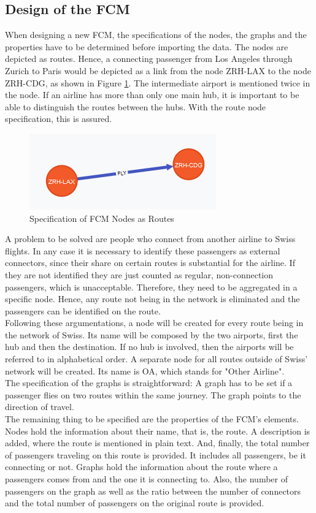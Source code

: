 \documentclass[conference]{IEEEtran}
\begin{document}
\subsection{Design of the FCM}
When designing a new FCM, the specifications of the nodes, the graphs and the properties have to be determined before importing the data. The nodes are depicted as routes. Hence, a connecting passenger from Los Angeles through Zurich to Paris would be depicted as a link from the node ZRH-LAX to the node ZRH-CDG, as shown in Figure \ref{fig:noderoute}. The intermediate airport is mentioned twice in the node. If an airline has more than only one main hub, it is important to be able to distinguish the routes between the hubs. With the route node specification, this is assured.
\begin{figure}[h]
\includegraphics{noderoute.png}
\caption{Specification of FCM Nodes as Routes}
\label{fig:noderoute}
\end{figure}
A problem to be solved are people who connect from another airline to Swiss flights. In any case it is necessary to identify these passengers as external connectors, since their share on certain routes is substantial for the airline. If they are not identified they are just counted as regular, non-connection passengers, which is unacceptable. Therefore, they need to be aggregated in a specific node. Hence, any route not being in the network is eliminated and the passengers can be identified on the route.\\
Following these argumentations, a node will be created for every route being in the network of Swiss. Its name will be composed by the two airports, first the hub and then the destination. If no hub is involved, then the airports will be referred to in alphabetical order. A separate node for all routes outside of Swiss' network will be created. Its name is OA, which stands for "Other Airline".\\
The specification of the graphs is straightforward: A graph has to be set if a passenger flies on two routes within the same journey. The graph points to the direction of travel.\\
The remaining thing to be specified are the properties of the FCM's elements. Nodes hold the information about their name, that is, the route. A description is added, where the route is mentioned in plain text. And, finally, the total number of passengers traveling on this route is provided. It includes all passengers, be it connecting or not. Graphs hold the information about the route where a passengers comes from and the one it is connecting to. Also, the number of passengers on the graph as well as the ratio between the number of connectors and the total number of passengers on the original route is provided.\\
\end{document}
